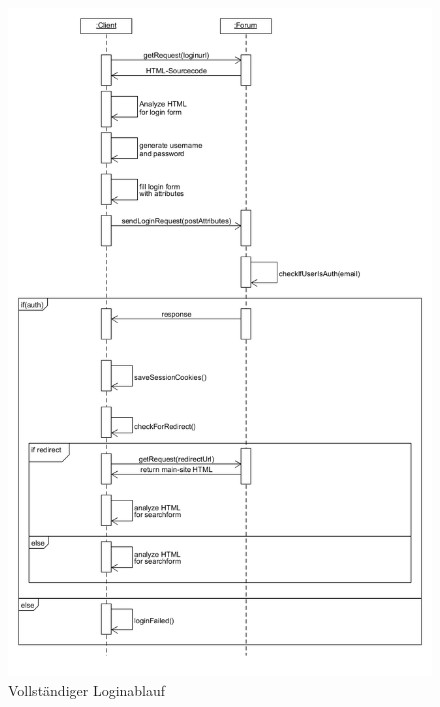 	\begin{figure}[ht]
		\includegraphics[width=\textwidth,height=\textheight,keepaspectratio]{./diagrams/login_seq.png}
		\caption{Vollständiger Loginablauf}
	\end{figure}
	
